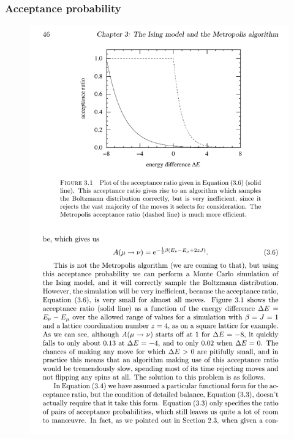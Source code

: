 \documentclass[hyperref={colorlinks=true}]{beamer}
\begin{document}
\begin{frame}%
  \frametitle{Acceptance probability}
  
  \begin{figure}
    \centering
    \includegraphics[width=\columnwidth]{MetropolisAlgorithmAcceptanceRatio.pdf}
  \end{figure}
  
\end{frame}

\end{document}
